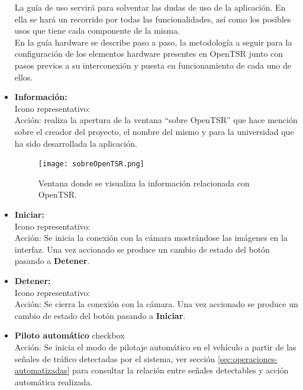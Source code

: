 \begin{itemize}
La guía de uso servirá para solventar las dudas de uso de la aplicación. En ella se hará un recorrido por todas las funcionalidades, así como los posibles usos que tiene cada componente de la misma.\\

En la guía hardware se describe paso a paso, la metodología a seguir para la configuración de los elementos hardware presentes en OpenTSR junto con pasos previos a su interconexión y puesta en funcionamiento de cada uno de ellos.

\item \textbf{Información:}\\
Icono representativo:\quad {} \\
Acción: realiza la apertura de la ventana ``sobre OpenTSR'' que hace mención sobre el creador del proyecto, el nombre del mismo y para la universidad que ha sido desarrollada la aplicación.

\begin{figure}[H]
  \begin{center}
    \texttt{[image: sobreOpenTSR.png]}
  \end{center}
  \caption{Ventana donde se visualiza la información relacionada con OpenTSR.}
  \label{fig:ventana-informacion}
\end{figure}


\item \textbf{Iniciar:}\\
Icono representativo:\quad {} \\
Acción: Se inicia la conexión con la cámara mostrándose las imágenes en la interfaz. Una vez accionado se produce un cambio de estado del botón pasando a \textbf{Detener}.

\item \textbf{Detener:}\\
Icono representativo:\quad {} \\
Acción: Se cierra la conexión con la cámara. Una vez accionado se produce un cambio de estado del botón pasando a \textbf{Iniciar}.

\item \textbf{Piloto automático}
checkbox \\
Acción: Se inicia el modo de pilotaje automático en el vehículo a partir de las señales de tráfico detectadas por el sistema, ver sección \ref{sec:operaciones-automatizadas} para consultar la relación entre señales detectables y acción automática realizada.

\end{itemize}

